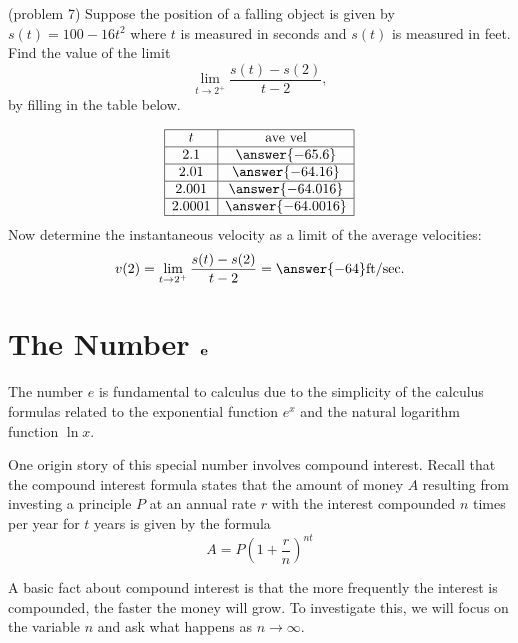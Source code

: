 \documentclass[handout]{ximera}
\begin{document}
\begin{problem}(problem 7)
Suppose the position of a falling object is given by $s(t) = 100-16t^2$ where $t$ is measured in seconds and $s(t)$ is measured in feet.
Find the value of the limit
\[
\lim_{t\to 2^+} \frac{s(t) - s(2)}{t-2},
\]
by filling in the table below.

\[
\begin{array}{| c | c |}
	\hline
  t & \text{ave vel}\\
  \hline
  2.1 & \answer{-65.6}   \\ 
	\hline 
	 2.01 & \answer{-64.16} \\
	\hline
	 2.001 & \answer{-64.016} \\
	\hline
	 2.0001 & \answer{-64.0016}\\
	\hline
\end{array}
\]
Now determine the instantaneous velocity as a limit of the average velocities:
\[
v(2) = \lim_{t\to 2^+} \frac{s(t) - s(2)}{t-2} = \answer{-64} \text{ft/sec}.
\]


\end{problem}



\section{The Number ${\bf e}$}

The number $e$ is fundamental to calculus due to the simplicity of the calculus formulas related to the 
exponential function $e^x$ and the natural logarithm function $\ln x$. 

One origin story of this special number involves compound interest. 
Recall that the compound interest formula states that the amount of money $A$ resulting from investing a principle $P$ at an annual rate $r$ with 
the interest compounded $n$ times per year for $t$ years is given by the formula 
\[ A = P\left(1+\frac{r}{n}\right)^{nt} \]

A basic fact about compound interest is that the more frequently 
the interest is compounded, the faster the money will grow. 
To investigate this, we will focus on the variable $n$ and ask what happens as $n \to \infty.$
\end{document}
